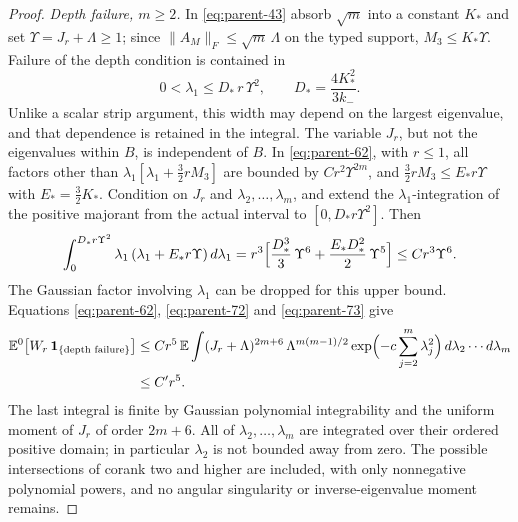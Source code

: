 \begin{proof}
\emph{Depth failure, $m\ge2$.} In \eqref{eq:parent-43} absorb $\sqrt m$ into a constant $K_*$ and set $\Upsilon=J_r+\Lambda\ge1$; since $\|A_M\|_F\le\sqrt m\,\Lambda$ on the typed support, $M_3\le K_*\Upsilon$. Failure of the depth condition is contained in
\begin{equation}\label{eq:parent-71}
0<\lambda_1\le D_*\,r\,\Upsilon^2,\qquad D_*=\frac{4K_*^2}{3k_-}.
\end{equation}
Unlike a scalar strip argument, this width may depend on the largest eigenvalue, and that dependence is retained in the integral. The variable $J_r$, but not the eigenvalues within $B$, is independent of $B$. In \eqref{eq:parent-62}, with $r\le1$, all factors other than $\lambda_1[\lambda_1+\frac32rM_3]$ are bounded by $Cr^2\Upsilon^{2m}$, and $\frac32rM_3\le E_*r\Upsilon$ with $E_*=\frac32K_*$. Condition on $J_r$ and $\lambda_2,\dots,\lambda_m$, and extend the $\lambda_1$-integration of the positive majorant from the actual interval to $[0,D_*r\Upsilon^2]$. Then
\begin{equation}\label{eq:parent-73}
\int_0^{D_*r\Upsilon^2}\lambda_1\,(\lambda_1+E_*r\Upsilon)\,d\lambda_1=r^3\Bigl[\frac{D_*^3}3\,\Upsilon^6+\frac{E_*D_*^2}2\,\Upsilon^5\Bigr]\le Cr^3\Upsilon^6 .
\end{equation}
The Gaussian factor involving $\lambda_1$ can be dropped for this upper bound. Equations \eqref{eq:parent-62}, \eqref{eq:parent-72} and \eqref{eq:parent-73} give
\begin{equation}\label{eq:parent-74}
\begin{aligned}
\mathbb E^0\bigl[W_r\,\mathbf 1_{\{\text{depth failure}\}}\bigr]&\le Cr^5\,\mathbb E\int(J_r+\Lambda)^{2m+6}\,\Lambda^{m(m-1)/2}\exp\Bigl(-c\sum_{j=2}^m\lambda_j^2\Bigr)\,d\lambda_2\cdots d\lambda_m\\
&\le C'r^5 .
\end{aligned}
\end{equation}
The last integral is finite by Gaussian polynomial integrability and the uniform moment of $J_r$ of order $2m+6$. All of $\lambda_2,\dots,\lambda_m$ are integrated over their ordered positive domain; in particular $\lambda_2$ is not bounded away from zero. The possible intersections of corank two and higher are included, with only nonnegative polynomial powers, and no angular singularity or inverse-eigenvalue moment remains.


\end{proof}
